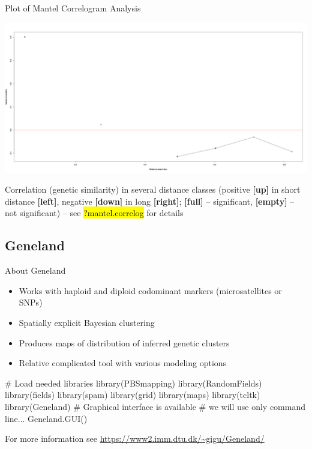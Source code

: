 \documentclass[compress, ucs, xelatex, 11pt, xcolor=svgnames,
  hyperref={
    bookmarks=true,
    unicode=true,
    colorlinks=true,
    pdftitle={Molecular data in R},
    plainpages=false,
    pdfauthor={Vojtech Zeisek},
    pdfsubject={Course about phylogeny and evolution in R},
    pdfcreator={XeLaTeX},
    pdfkeywords={R, evolution, phylogeny, molecular data},
    linkcolor=Tomato,
    anchorcolor=SaddleBrown,
    citecolor=Goldenrod,
    filecolor=DarkMagenta,
    menucolor=Sienna,
    urlcolor=DarkTurquoise,
    pdftex},
  url={hyphens, lowtilde} %
  ]{beamer}
\renewcommand{\texttt}[1]{\hl{\ttfamily #1}}
\begin{document}
\begin{frame}{Plot of Mantel Correlogram Analysis}
  \begin{center}
    \includegraphics[width=\textwidth-1cm]{mantel-cor.png}
  \end{center}

  Correlation (genetic similarity) in several distance classes (positive \textbf{[up]} in short distance \textbf{[left]}, negative \textbf{[down]} in long \textbf{[right]}; \textbf{[full]} -- significant, \textbf{[empty]} -- not significant) -- see \texttt{?mantel.correlog} for details
\end{frame}

\subsection{Geneland}

\begin{frame}[fragile]{About Geneland}
\begin{multicols}{2}
  \begin{itemize}
    \item Works with haploid and diploid codominant markers (microsatellites or SNPs)
    \item Spatially explicit Bayesian clustering
    \item Produces maps of distribution of inferred genetic clusters
    \item Relative complicated tool with various modeling options
  \end{itemize}
  \columnbreak
  \begin{spluscode}
    # Load needed libraries
    library(PBSmapping)
    library(RandomFields)
    library(fields)
    library(spam)
    library(grid)
    library(maps)
    library(tcltk)
    library(Geneland)
    # Graphical interface is available
    # we will use only command line...
    Geneland.GUI()
  \end{spluscode}
\end{multicols}
For more information see \url{https://www2.imm.dtu.dk/~gigu/Geneland/}
\end{frame}
\end{document}
